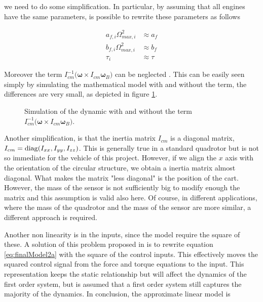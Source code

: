 \noindent we need to do some simplification. In particular, by assuming that all engines have the same parameters, is possible to rewrite these parameters as follows

\begin{align}
	a_{f,i}\Omega_{max,i}^2 &\approx a_f \\
	b_{f,i}\Omega_{max,i}^2 &\approx b_f \\
	\tau_i &\approx \tau
	\label{eq:simplification}
\end{align}

\noindent Moreover the term $I_{cm}^{-1}\bigl(\boldsymbol{\omega}\times I_{cm}\boldsymbol{\omega}_B\bigl)$ can be neglected \cite{modelIdentification}. This can be easily seen simply by simulating the mathematical model with and without the term, the differences are very small, as depicted in figure \ref{fig:comparisonOmega}. 

\begin{figure}[h]
	\centering
	
	\caption{Simulation of the dynamic with and without the term $I_{cm}^{-1}\bigl(\boldsymbol{\omega}\times I_{cm}\boldsymbol{\omega}_B\bigl)$.}
	\label{fig:comparisonOmega}
\end{figure}

\noindent Another simplification, is that the inertia matrix $I_{cm}$ is a diagonal matrix, $I_{cm} = \operatorname*{diag}(\allowbreak I_{xx}, I_{yy}, I_{zz})$. This is generally true in a standard quadrotor but is not so immediate for the vehicle of this project. However, if we align the $x$ axis with the orientation of the circular structure, we obtain a inertia matrix almost diagonal. What makes the matrix "less diagonal" is the position of the cart. However, the mass of the sensor is not sufficiently big to modify enough the matrix and this assumption is valid also here. Of course, in different applications, where the mass of the quadrotor and the mass of the sensor are more similar, a different approach is required. 

\noindent Another non linearity is in the inputs, since the model require the square of these. A solution of this problem proposed in \cite{modelIdentification} is to rewrite equation \eqref{eq:finalModel2a} with the square of the control inputs. This effectively moves the squared control signal from the force and torque equations to the input. This representation keeps the static relationship but will affect the dynamics of the first order system, but is assumed that a first order system still captures the majority of the dynamics. In conclusion, the approximate linear model is

